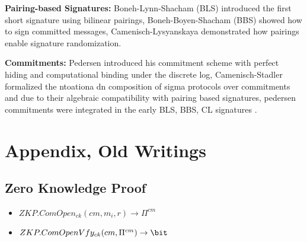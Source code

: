     \item \textbf{Pairing-based Signatures: } Boneh-Lynn-Shacham (BLS) \cite{goos_short_2001} introduced the first short signature using bilinear pairings, Boneh-Boyen-Shacham (BBS) \cite{hutchison_short_2004} showed how to sign committed messages, Camenisch-Lysyanskaya \cite{cimato_signature_2003, hutchison_signature_2004} demonstrated how pairings enable signature randomization.

    \item \textbf{Commitments: } \cite{pedersen1991non} Pedersen introduced his commitment scheme with perfect hiding and computational binding under the discrete log, \cite{goos_efficient_1997} Camenisch-Stadler formalized the ntoationa dn composition of sigma protocols over commitments and due to their algebraic compatibility with pairing based signatures, pedersen commitments were integrated in the early BLS, BBS, CL signatures \cite{goos_short_2001, hutchison_short_2004, hutchison_signature_2004}. 
    









\section{Appendix, Old Writings}
\newpage


\subsection{Zero Knowledge Proof}
\begin{itemize}
    \item $ZKP.ComOpen_{ck}(cm, m_i, r) \to \Pi^{cm}$
    \item $ZKP.ComOpenVfy_{ck}(cm, \Pi^{cm}) \to \bit$
\end{itemize}

